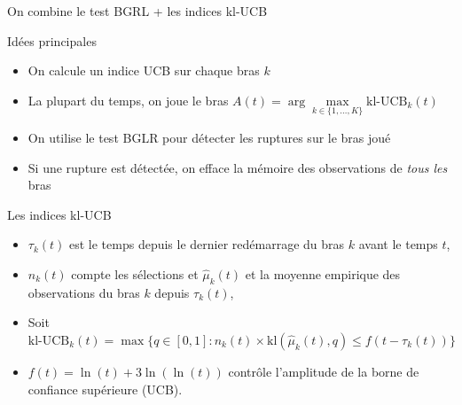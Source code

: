 \documentclass[11pt,french,ignorenonframetext,]{beamer}
\begin{document}
\begin{frame}{On combine le test BGRL + les indices kl-UCB}

  \begin{block}{Idées principales}
    \begin{itemize}
      \item On calcule un indice UCB sur chaque bras $k$
      \item La plupart du temps, on joue le bras
      $A(t) = \arg\max\limits_{k\in \{1,\dots,K\}} \mbox{kl-UCB}_k(t)$
      \item On utilise le test BGLR \alert{pour détecter les ruptures sur le bras joué}
      \item Si une rupture est détectée, \alert{on efface la mémoire des observations de \emph{tous les} bras}
    \end{itemize}
  \end{block}

  \pause

  \begin{exampleblock}{Les indices kl-UCB}
    \begin{itemize}
      \item $\tau_k(t)$ est le temps depuis le dernier redémarrage du bras $k$ avant le temps $t$,
      \item $n_k(t)$ compte les sélections et $\widehat{\mu}_k(t)$ et la moyenne empirique des observations du bras $k$ depuis $\tau_k(t)$,
      \item Soit {\small $\mbox{kl-UCB}_k(t) = \max \bigl\{ q\in[0,1] : n_k(t) \times \mathrm{kl}\left(\widehat{\mu}_k(t),q\right) \leq f(t - \tau_k(t)) \bigr\}$ }
      \item $f(t) = \ln(t) + 3 \ln(\ln(t))$ contrôle l'amplitude de la borne de confiance supérieure (UCB).
    \end{itemize}
  \end{exampleblock}

\end{frame}
\end{document}
